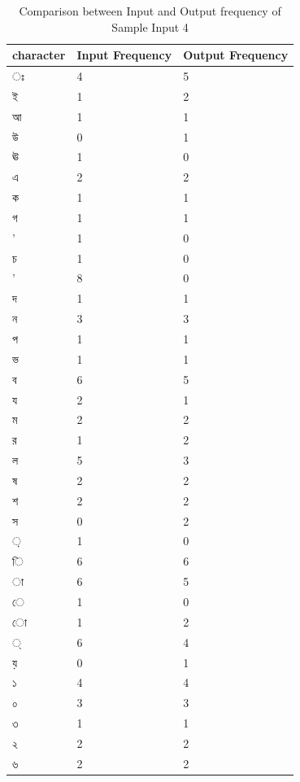 \begin{table}[H]
\centering
\begin{tabular}{|p{2cm}|p{2cm}|p{2cm}|}
\hline
character & Input Frequency & Output Frequency \\
\hline
{\bengalifont ঃ} & 4 & 5\\
\hline
{\bengalifont ই} & 1 & 2\\
\hline
{\bengalifont আ} & 1 & 1\\
\hline
{\bengalifont উ} & 0 & 1\\
\hline
{\bengalifont ঊ} & 1 & 0\\
\hline
{\bengalifont এ} & 2 & 2\\
\hline
{\bengalifont ক} & 1 & 1\\
\hline
{\bengalifont গ} & 1 & 1\\
\hline
{\bengalifont ’} & 1 & 0\\
\hline
{\bengalifont চ} & 1 & 0\\
\hline
{\bengalifont '} & 8 & 0\\
\hline
{\bengalifont দ} & 1 & 1\\
\hline
{\bengalifont ন} & 3 & 3\\
\hline
{\bengalifont প} & 1 & 1\\
\hline
{\bengalifont ভ} & 1 & 1\\
\hline
{\bengalifont ব} & 6 & 5\\
\hline
{\bengalifont য} & 2 & 1\\
\hline
{\bengalifont ম} & 2 & 2\\
\hline
{\bengalifont র} & 1 & 2\\
\hline
{\bengalifont ল} & 5 & 3\\
\hline
{\bengalifont ষ} & 2 & 2\\
\hline
{\bengalifont শ} & 2 & 2\\
\hline
{\bengalifont স} & 0 & 2\\
\hline
{\bengalifont ়} & 1 & 0\\
\hline
{\bengalifont ি} & 6 & 6\\
\hline
{\bengalifont া} & 6 & 5\\
\hline
{\bengalifont ে} & 1 & 0\\
\hline
{\bengalifont ো} & 1 & 2\\
\hline
{\bengalifont ্} & 6 & 4\\
\hline
{\bengalifont য়} & 0 & 1\\
\hline
{\bengalifont ১} & 4 & 4\\
\hline
{\bengalifont ০} & 3 & 3\\
\hline
{\bengalifont ৩} & 1 & 1\\
\hline
{\bengalifont ২} & 2 & 2\\
\hline
{\bengalifont ৬} & 2 & 2\\
\hline
\end{tabular}
\caption { Comparison between Input and Output frequency of Sample Input 4}
\label {tab:BTable4}
\end{table}

